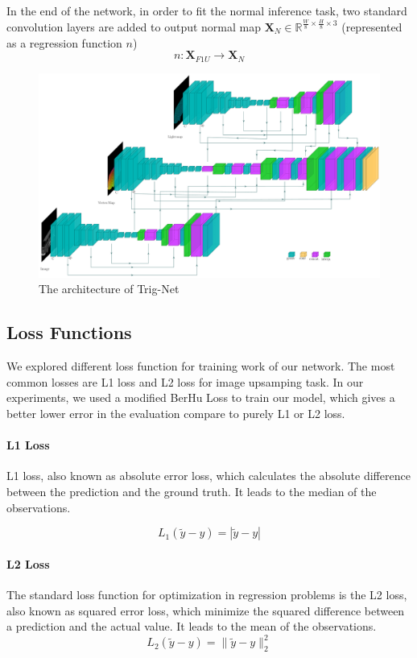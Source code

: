 In the end of the network, in order to fit the normal inference task, two standard convolution layers are added to output normal map $ \textbf{X}_{N} \in  \mathbb{R}^{\frac{W}{8}\times \frac{H}{8}\times 3} $ (represented as a regression function $ n $)
\[n:\textbf{X}_{F1U} \rightarrow  \textbf{X}_{N} \] 

\begin{figure}
	\centering
	\includegraphics[width=1\textwidth]{Figures/trignet} %
	\decoRule
	\caption{The architecture of Trig-Net}
	\label{fig:Trig-Net}
\end{figure}




\subsection{Loss Functions}
We explored different loss function for training work of our network. The most common losses are L1 loss and L2 loss for image upsamping task. In our experiments, we used a modified BerHu Loss to train our model, which gives a better lower error in the evaluation compare to purely L1 or L2 loss. 
\paragraph{L1 Loss}
L1 loss, also known as absolute error loss, which calculates the absolute difference between the prediction and the ground truth. It leads to the median of the observations.

\[ L_1(\tilde y - y) = |\tilde y - y | \]

\paragraph{L2 Loss}
The standard loss function for optimization in regression problems is the L2 loss, also known as squared error loss, which minimize the squared difference between a prediction and the actual value. It leads to the mean of the observations. 
\[ L_2(\tilde y - y) = \|\tilde y - y \|_2^2 \]


